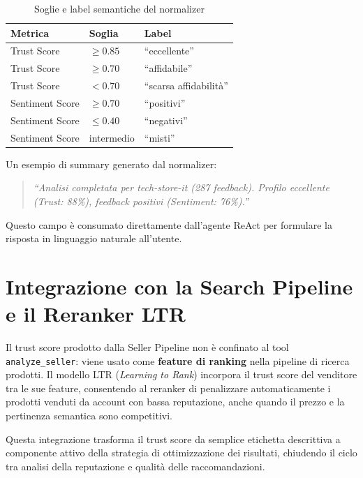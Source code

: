\begin{table}[htbp]
\centering
\caption{Soglie e label semantiche del normalizer}
\label{tab:normalizer-thresholds}
\begin{tabular}{lll}
\hline
\textbf{Metrica} & \textbf{Soglia} & \textbf{Label} \\
\hline
Trust Score & $\geq 0.85$ & ``eccellente'' \\
Trust Score & $\geq 0.70$ & ``affidabile'' \\
Trust Score & $< 0.70$    & ``scarsa affidabilità'' \\
\hline
Sentiment Score & $\geq 0.70$ & ``positivi'' \\
Sentiment Score & $\leq 0.40$ & ``negativi'' \\
Sentiment Score & intermedio  & ``misti'' \\
\hline
\end{tabular}
\end{table}

Un esempio di summary generato dal normalizer:

\begin{quotation}
\textit{``Analisi completata per tech-store-it (287 feedback). Profilo
eccellente (Trust: 88\%), feedback positivi (Sentiment: 76\%).''}
\end{quotation}

Questo campo è consumato direttamente dall'agente ReAct per formulare
la risposta in linguaggio naturale all'utente.


\section{Integrazione con la Search Pipeline e il Reranker LTR}
\label{sec:seller-ltr-integration}

Il trust score prodotto dalla Seller Pipeline non è confinato al tool
\texttt{analyze\_seller}: viene usato come \textbf{feature di ranking}
nella pipeline di ricerca prodotti. Il modello LTR
(\emph{Learning to Rank}) incorpora il trust score del venditore tra
le sue feature, consentendo al reranker di penalizzare automaticamente
i prodotti venduti da account con bassa reputazione, anche quando il
prezzo e la pertinenza semantica sono competitivi.

Questa integrazione trasforma il trust score da semplice etichetta
descrittiva a componente attivo della strategia di ottimizzazione
dei risultati, chiudendo il ciclo tra analisi della reputazione e
qualità delle raccomandazioni.



